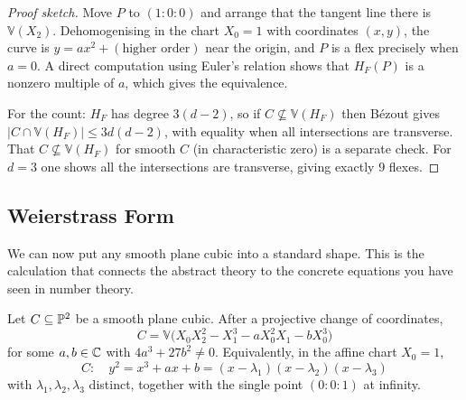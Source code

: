 \documentclass[a4paper]{scrartcl}
\newcommand{\V}{\mathbb{V}}
\begin{document}
\begin{proof}[Proof sketch]
	Move $P$ to $(1:0:0)$ and arrange that the tangent line there is $\V(X_2)$. Dehomogenising in the chart $X_0 = 1$ with coordinates $(x,y)$, the curve is $y = a x^2 + (\text{higher order})$ near the origin, and $P$ is a flex precisely when $a = 0$. A direct computation using Euler's relation shows that $H_F(P)$ is a nonzero multiple of $a$, which gives the equivalence.

	For the count: $H_F$ has degree $3(d-2)$, so if $C \not\subseteq \V(H_F)$ then B\'ezout gives $|C \cap \V(H_F)| \leq 3d(d-2)$, with equality when all intersections are transverse. That $C \not\subseteq \V(H_F)$ for smooth $C$ (in characteristic zero) is a separate check. For $d = 3$ one shows all the intersections are transverse, giving exactly $9$ flexes.
\end{proof}

\subsection{Weierstrass Form}

We can now put any smooth plane cubic into a standard shape. This is the calculation that connects the abstract theory to the concrete equations you have seen in number theory.

\begin{theorem}\label{thm:weierstrass}
	Let $C \subseteq \mathbb{P}^2$ be a smooth plane cubic. After a projective change of coordinates,
	$$C = \V\big(X_0X_2^2 - X_1^3 - aX_0^2X_1 - bX_0^3\big)$$
	for some $a,b \in \mathbb{C}$ with $4a^3 + 27b^2 \neq 0$. Equivalently, in the affine chart $X_0 = 1$,
	$$C \colon\quad y^2 = x^3 + ax + b = (x-\lambda_1)(x-\lambda_2)(x-\lambda_3)$$
	with $\lambda_1,\lambda_2,\lambda_3$ distinct, together with the single point $(0:0:1)$ at infinity.
\end{theorem}
\end{document}
